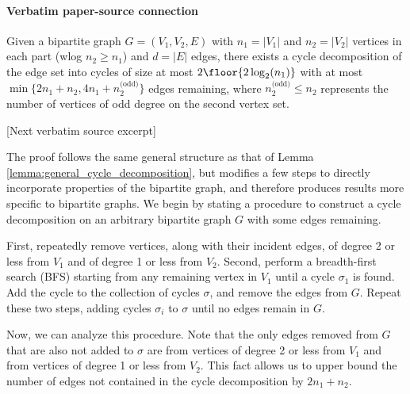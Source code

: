 \documentclass[10pt]{article}
\begin{document}
\paragraph{Verbatim paper-source connection}
\begin{ReviewVerbatim}
\begin{lemma}\label{lemma:bipartite_cycle_decomposition}
			Given a bipartite graph $G = (V_1, V_2, E)$ with $n_1 = |V_1|$ and $n_2 = |V_2|$ vertices in each part (wlog $n_2 \geq n_1$) and $d = |E|$ edges, there exists a cycle decomposition of the edge set into cycles of size at most $2 \floor{2 \log_2(n_1)}$ with at most $\min\{2n_1 + n_2, 4n_1 + n_2^\text{(odd)}\}$ edges remaining, where $n_2^\text{(odd)} \leq n_2$ represents the number of vertices of odd degree on the second vertex set.
		\end{lemma}

[Next verbatim source excerpt]

			The proof follows the same general structure as that of Lemma \ref{lemma:general_cycle_decomposition}, but modifies a few steps to directly incorporate properties of the bipartite graph, and therefore produces results more specific to bipartite graphs. We begin by stating a procedure to construct a cycle decomposition on an arbitrary bipartite graph $G$ with some edges remaining.

			First, repeatedly remove vertices, along with their incident edges, of degree 2 or less from $V_1$ and of degree 1 or less from $V_2$. Second, perform a breadth-first search (BFS) starting from any remaining vertex in $V_1$ until a cycle $\sigma_1$ is found. Add the cycle to the collection of cycles $\sigma$, and remove the edges from $G$. Repeat these two steps, adding cycles $\sigma_i$ to $\sigma$ until no edges remain in $G$.

			Now, we can analyze this procedure. Note that the only edges removed from $G$ that are also not added to $\sigma$ are from vertices of degree 2 or less from $V_1$ and from vertices of degree 1 or less from $V_2$. This fact allows us to upper bound the number of edges not contained in the cycle decomposition by $2n_1 + n_2$.


\end{ReviewVerbatim}
\end{document}
